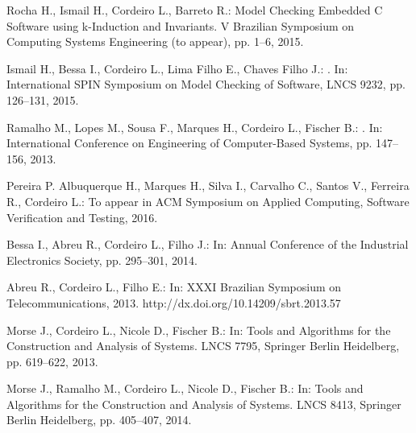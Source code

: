 \documentclass{acm_sen_article}
\begin{document}
\begin{thebibliography}{1}
Rocha H., Ismail H., Cordeiro L., Barreto R.:
\newblock Model Checking Embedded C Software using k-Induction and Invariants. 
\newblock V Brazilian Symposium on Computing Systems Engineering (to appear), pp. 1--6, 2015.

Ismail H., Bessa I., Cordeiro L., Lima Filho E., Chaves Filho J.:
. 
\newblock In: International SPIN Symposium on Model Checking of Software, LNCS 9232, pp. 126--131, 2015.

Ramalho M., Lopes M., Sousa F., Marques H., Cordeiro L., Fischer B.:
.
\newblock In: International Conference on Engineering of Computer-Based Systems, pp. 147--156, 2013.

Pereira P.  Albuquerque H., Marques H., Silva I., Carvalho C., Santos V., Ferreira R., Cordeiro L.: 
\newblock To appear in ACM Symposium on Applied Computing, Software Verification and Testing, 2016. 

Bessa I., Abreu R., Cordeiro L., Filho J.:
\newblock In: Annual Conference of the Industrial Electronics Society, pp. 295--301, 2014.

Abreu R., Cordeiro L., Filho E.:
\newblock In: XXXI Brazilian Symposium on Telecommunications, 2013.
\newblock http://dx.doi.org/10.14209/sbrt.2013.57

Morse J., Cordeiro L., Nicole D., Fischer B.:
\newblock In: Tools and Algorithms for the Construction and Analysis of
  Systems. LNCS 7795, Springer Berlin Heidelberg, pp. 619--622, 2013.

Morse J., Ramalho M., Cordeiro L., Nicole D., Fischer B.:
\newblock In: Tools and Algorithms for the Construction and Analysis of
  Systems. LNCS 8413, Springer Berlin Heidelberg, pp. 405--407, 2014.

\end{thebibliography}




\end{document}
